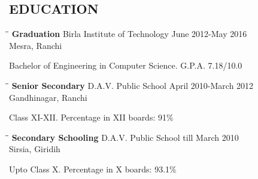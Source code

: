 \documentclass{res}
\begin{document}
\begin{resume}
\section{EDUCATION}          
    \vspace{-0.1in}	
   \begin{tabbing}
   \hspace{2.1in}\= \hspace{2.3in}\= \kill %
    {\bf Graduation}  \>Birla Institute of Technology \> June 2012-May 2016\\
    				\>Mesra, Ranchi
    \end{tabbing}\vspace{-20pt}      %
    \begin{tabbing}  \hspace{0.2in}
    Bachelor of Engineering in Computer Science. G.P.A. 7.18/10.0
    \end{tabbing}\vspace{-20pt}
    \begin{tabbing}
   \hspace{2.1in}\= \hspace{2.3in}\= \kill %
    {\bf Senior Secondary}  \>D.A.V. Public School \> April 2010-March 2012\\
    				\>Gandhinagar, Ranchi
    \end{tabbing}\vspace{-20pt}      %
    \begin{tabbing}  \hspace{0.2in}
    Class XI-XII. Percentage in XII boards: 91\%
    \end{tabbing}\vspace{-20pt}
     \begin{tabbing}
   \hspace{2.1in}\= \hspace{2.3in}\= \kill %
    {\bf Secondary Schooling}  \>D.A.V. Public School \> till March 2010\\
    				\>Sirsia, Giridih
    \end{tabbing}\vspace{-20pt}      %
    \begin{tabbing}  \hspace{0.2in}
    Upto Class X. Percentage in X boards: 93.1\%
    \end{tabbing}


\end{resume}
\end{document}
